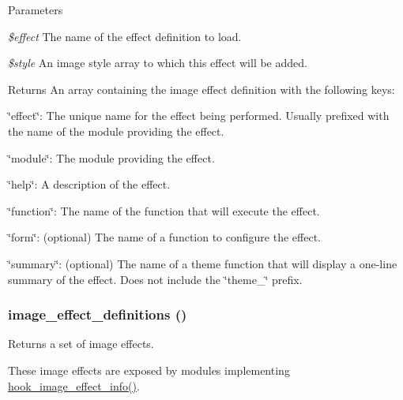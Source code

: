 \begin{DoxyParams}{Parameters}
\item[{\em \$effect}]The name of the effect definition to load. \item[{\em \$style}]An image style array to which this effect will be added.\end{DoxyParams}
\begin{DoxyReturn}{Returns}
An array containing the image effect definition with the following keys:
\begin{DoxyItemize}
\item \char`\"{}effect\char`\"{}: The unique name for the effect being performed. Usually prefixed with the name of the module providing the effect.
\item \char`\"{}module\char`\"{}: The module providing the effect.
\item \char`\"{}help\char`\"{}: A description of the effect.
\item \char`\"{}function\char`\"{}: The name of the function that will execute the effect.
\item \char`\"{}form\char`\"{}: (optional) The name of a function to configure the effect.
\item \char`\"{}summary\char`\"{}: (optional) The name of a theme function that will display a one-\/line summary of the effect. Does not include the \char`\"{}theme\_\-\char`\"{} prefix. 
\end{DoxyItemize}
\end{DoxyReturn}
\hypertarget{image_8module_a8b4b01544349854c77bad8727d52f7d1}{
\subsubsection[{image\_\-effect\_\-definitions}]{\setlength{\rightskip}{0pt plus 5cm}image\_\-effect\_\-definitions ()}}
\label{image_8module_a8b4b01544349854c77bad8727d52f7d1}
Returns a set of image effects.

These image effects are exposed by modules implementing \hyperlink{group__hooks_ga9681816aeb01a316e98457b40a01f8ed}{hook\_\-image\_\-effect\_\-info()}.

